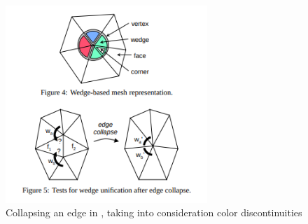 \begin{figure}
    \centering
    \includegraphics[width=3in]{Figures/edge_collapse.png}
    \caption{Collapsing an edge in \cite{hoppe1999new}, taking into consideration color discontinuities}
    \label{fig:edge_collapse}
\end{figure}
